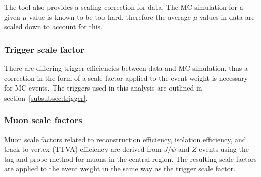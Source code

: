 The tool also provides a scaling correction for data. The MC simulation for a given $\mu$ value is known to be too hard, therefore the average $\mu$ values in data are scaled down to account for this.

\subsubsection{Trigger scale factor}
There are differing trigger efficiencies between data and MC simulation, thus a correction in the form of a scale factor applied to the event weight is necessary for MC events. The triggers used in this analysis are outlined in section~\ref{subsubsec:trigger}.

\subsubsection{Muon scale factors}
Muon scale factors related to reconstruction efficiency, isolation efficiency, and track-to-vertex (TTVA) efficiency are derived from $J/\psi$ and $Z$ events using the tag-and-probe method for muons in the central region. The resulting scale factors are applied to the event weight in the same way as the trigger scale factor.


